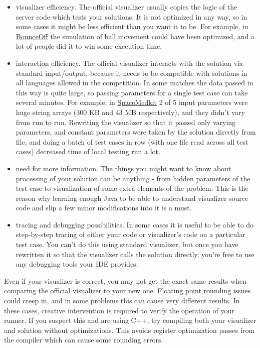 \begin{itemize}
\item
  visualizer efficiency. The official visualizer usually copies the
  logic of the server code which tests your solutions. It is not
  optimized in any way, so in some cases it might be less efficient than
  you want it to be. For example, in
  \href{http://www.topcoder.com/longcontest/?module=ViewProblemStatement\&rd=13768\&pm=10372}{BounceOff}
  the simulation of ball movement could have been optimized, and a lot
  of people did it to win some execution time.
\item
  interaction efficiency. The official visualizer interacts with the
  solution via standard input/output, because it needs to be compatible
  with solutions in all languages allowed in the competition. In some
  matches the data passed in this way is quite large, so passing
  parameters for a single test case can take several minutes. For
  example, in
  \href{http://www.topcoder.com/longcontest/?module=ViewProblemStatement\&rd=14002\&pm=10680}{SpaceMedkit}
  2 of 5 input parameters were huge string arrays (300 KB and 43 MB
  respectively), and they didn't vary from run to run. Rewriting the
  visualizer so that it passed only varying parameters, and constant
  parameters were taken by the solution directly from file, and doing a
  batch of test cases in row (with one file read across all test cases)
  decreased time of local testing run a lot.
\item
  need for more information. The things you might want to know about
  processing of your solution can be anything - from hidden parameters
  of the test case to visualization of some extra elements of the
  problem. This is the reason why learning enough Java to be able to
  understand visualizer source code and slip a few minor modifications
  into it is a must.
\item
  tracing and debugging possibilities. In some cases it is useful to be
  able to do step-by-step tracing of either your code or visualizer's
  code on a particular test case. You can't do this using standard
  visualizer, but once you have rewritten it so that the visualizer
  calls the solution directly, you're free to use any debugging tools
  your IDE provides.
\end{itemize}

Even if your visualizer is correct, you may not get the exact same
results when comparing the official visualizer to your new one. Floating
point rounding issues could creep in, and in some problems this can
cause very different results. In these cases, creative intervention is
required to verify the operation of your runner. If you suspect this and
are using C++, try compiling both your visualizer and solution without
optimizations. This avoids register optimization passes from the
compiler which can cause some rounding errors.

